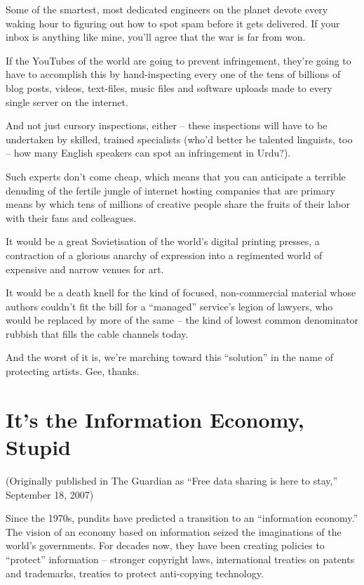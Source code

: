Some of the smartest, most dedicated engineers on the planet devote
every waking hour to figuring out how to spot spam before it gets
delivered. If your inbox is anything like mine, you'll agree that
the war is far from won.

If the YouTubes of the world are going to prevent infringement,
they're going to have to accomplish this by hand-inspecting every
one of the tens of billions of blog posts, videos, text-files,
music files and software uploads made to every single server on the
internet.

And not just cursory inspections, either -- these inspections will
have to be undertaken by skilled, trained specialists (who'd better
be talented linguists, too -- how many English speakers can spot an
infringement in Urdu?).

Such experts don't come cheap, which means that you can anticipate
a terrible denuding of the fertile jungle of internet hosting
companies that are primary means by which tens of millions of
creative people share the fruits of their labor with their fans and
colleagues.

It would be a great Sovietisation of the world's digital printing
presses, a contraction of a glorious anarchy of expression into a
regimented world of expensive and narrow venues for art.

It would be a death knell for the kind of focused, non-com\-mercial
material whose authors couldn't fit the bill for a ``managed''
service's legion of lawyers, who would be replaced by more of the
same -- the kind of lowest common denominator rubbish that fills
the cable channels today.

And the worst of it is, we're marching toward this ``solution'' in
the name of protecting artists. Gee, thanks.

\section{It's the Information Economy, Stupid}

(Originally published in The Guardian as ``Free data sharing is here
to stay,'' September 18, 2007)

Since the 1970s, pundits have predicted a transition to an
``information economy.'' The vision of an economy based on
information seized the imaginations of the world's governments. For
decades now, they have been creating policies to ``protect''
information -- stronger copyright laws, international treaties on
patents and trademarks, treaties to protect anti-copying
technology.

